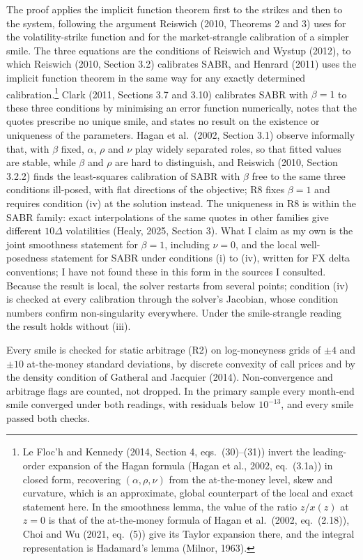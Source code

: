 \documentclass[11pt]{article}
\theoremstyle{result}
\newcommand{\D}{\Delta}
\begin{document}
The proof applies the implicit function theorem first to the strikes and then to the system, following the argument Reiswich (2010, Theorems 2 and 3) uses for the volatility-strike function and for the market-strangle calibration of a simpler smile. The three equations are the conditions of Reiswich and Wystup (2012), to which Reiswich (2010, Section 3.2) calibrates SABR, and Henrard (2011) uses the implicit function theorem in the same way for any exactly determined calibration.\footnote{Le Floc'h and Kennedy (2014, Section 4, eqs.~(30)--(31)) invert the leading-order expansion of the Hagan formula (Hagan et al., 2002, eq.~(3.1a)) in closed form, recovering $(\alpha,\rho,\nu)$ from the at-the-money level, skew and curvature, which is an approximate, global counterpart of the local and exact statement here. In the smoothness lemma, the value of the ratio $z/x(z)$ at $z=0$ is that of the at-the-money formula of Hagan et al.\ (2002, eq.~(2.18)), Choi and Wu (2021, eq.~(5)) give its Taylor expansion there, and the integral representation is Hadamard's lemma (Milnor, 1963).} Clark (2011, Sections 3.7 and 3.10) calibrates SABR with $\beta=1$ to these three conditions by minimising an error function numerically, notes that the quotes prescribe no unique smile, and states no result on the existence or uniqueness of the parameters. Hagan et al.\ (2002, Section 3.1) observe informally that, with $\beta$ fixed, $\alpha$, $\rho$ and $\nu$ play widely separated roles, so that fitted values are stable, while $\beta$ and $\rho$ are hard to distinguish, and Reiswich (2010, Section 3.2.2) finds the least-squares calibration of SABR with $\beta$ free to the same three conditions ill-posed, with flat directions of the objective; R8 fixes $\beta=1$ and requires condition (iv) at the solution instead. The uniqueness in R8 is within the SABR family: exact interpolations of the same quotes in other families give different $10\D$ volatilities (Healy, 2025, Section 3). What I claim as my own is the joint smoothness statement for $\beta=1$, including $\nu=0$, and the local well-posedness statement for SABR under conditions (i) to (iv), written for FX delta conventions; I have not found these in this form in the sources I consulted. Because the result is local, the solver restarts from several points; condition (iv) is checked at every calibration through the solver's Jacobian, whose condition numbers confirm non-singularity everywhere. Under the smile-strangle reading the result holds without (iii).

Every smile is checked for static arbitrage (R2) on log-moneyness grids of $\pm4$ and $\pm10$ at-the-money standard deviations, by discrete convexity of call prices and by the density condition of Gatheral and Jacquier (2014). Non-convergence and arbitrage flags are counted, not dropped. In the primary sample every month-end smile converged under both readings, with residuals below $10^{-13}$, and every smile passed both checks.
\end{document}
